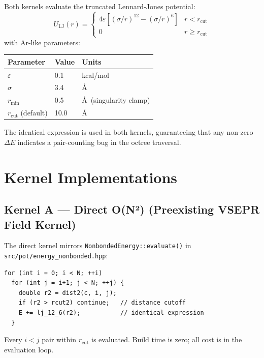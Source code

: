 \documentclass[11pt,a4paper]{article}
\theoremstyle{definition}
\theoremstyle{plain}
\newcommand{\rcut}{r_{\mathrm{cut}}}
\newcommand{\eps}{\varepsilon}
\begin{document}
Both kernels evaluate the truncated Lennard-Jones potential:
\begin{equation}
  U_{\mathrm{LJ}}(r) = \begin{cases}
	4\eps\left[(\sigma/r)^{12} - (\sigma/r)^{6}\right]
	  & r < \rcut \\
	0 & r \ge \rcut
  \end{cases}
  \label{eq:lj}
\end{equation}
with Ar-like parameters:
\begin{center}
\begin{tabular}{lll}
\toprule
Parameter & Value & Units \\
\midrule
$\eps$           & 0.1   & kcal/mol \\
$\sigma$         & 3.4   & \AA \\
$r_{\min}$       & 0.5   & \AA\ (singularity clamp) \\
$\rcut$ (default)& 10.0  & \AA \\
\bottomrule
\end{tabular}
\end{center}

The identical expression is used in both kernels, guaranteeing that any
non-zero $\Delta E$ indicates a pair-counting bug in the octree traversal.

\section{Kernel Implementations}
\label{sec:kernels}

\subsection{Kernel A — Direct O(N²) (Preexisting VSEPR Field Kernel)}
\label{sec:direct}

The direct kernel mirrors \texttt{NonbondedEnergy::evaluate()} in
\texttt{src/pot/energy\_nonbonded.hpp}:

\begin{lstlisting}
for (int i = 0; i < N; ++i)
  for (int j = i+1; j < N; ++j) {
	double r2 = dist2(c, i, j);
	if (r2 > rcut2) continue;   // distance cutoff
	E += lj_12_6(r2);           // identical expression
  }
\end{lstlisting}

Every $i < j$ pair within $\rcut$ is evaluated.  Build time is zero;
all cost is in the evaluation loop.
\end{document}
